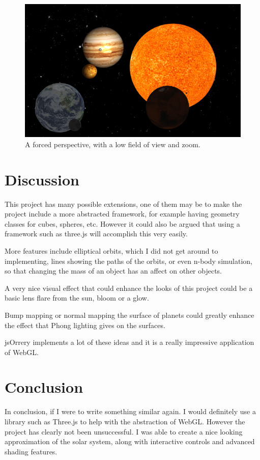 \documentclass{scrreprt}
\begin{document}
\begin{figure}[H]
\includegraphics[width=\textwidth]{images/fov}
\caption{A forced perspective, with a low field of view and zoom.}
\end{figure}

\chapter{Discussion}

This project has many possible extensions, one of them may be to make the project include a more abstracted framework, for example having geometry classes for cubes, spheres, etc. However it could also be argued that using a framework such as three.js\cite{threejs} will accomplish this very easily.

More features include elliptical orbits, which I did not get around to implementing, lines showing the paths of the orbits, or even n-body simulation, so that changing the mass of an object has an affect on other objects.

A very nice visual effect that could enhance the looks of this project could be a basic lens flare from the sun, bloom or a glow.

Bump mapping or normal mapping the surface of planets could greatly enhance the effect that Phong lighting gives on the surfaces.

jsOrrery\cite{buildingjsorrery} implements a lot of these ideas and it is a really impressive application of WebGL.

\chapter{Conclusion}

In conclusion, if I were to write something similar again. I would definitely use a library such as Three.js to help with the abstraction of WebGL. However the project has clearly not been unsuccessful. I was able to create a nice looking approximation of the solar system, along with interactive controls and advanced shading features.
\end{document}
